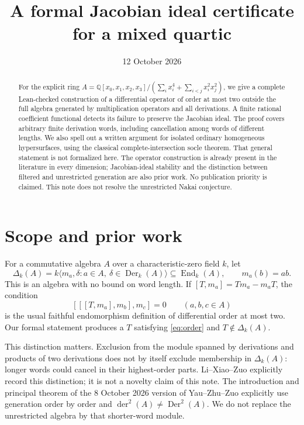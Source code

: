 \documentclass[11pt,letterpaper]{article}
\title{A formal Jacobian ideal certificate for a mixed quartic}
\author{}
\date{12 October 2026}
\theoremstyle{remark}\newtheorem{remark}[theorem]{Remark}
\DeclareMathOperator{\Der}{Der}
\DeclareMathOperator{\End}{End}
\newcommand{\QQ}{\mathbb Q}
\begin{document}
\maketitle
\begin{abstract}
For the explicit ring
\(A=\QQ[x_0,x_1,x_2,x_3]/(\sum_i x_i^4+\sum_{i<j}x_i^2x_j^2)\),
we give a complete Lean-checked construction of a differential operator of order
at most two outside the full algebra generated by multiplication operators and
all derivations. A finite rational coefficient functional detects its failure
to preserve the Jacobian ideal. The proof covers arbitrary finite derivation
words, including cancellation among words of different lengths. We also spell out
a written argument for isolated ordinary homogeneous hypersurfaces, using
the classical complete-intersection socle theorem. That general statement
is not formalized here. The operator construction is already present in the
literature in every dimension; Jacobian-ideal stability and the distinction
between filtered and unrestricted generation are also prior work. No
publication priority is claimed. This note does not
resolve the unrestricted Nakai conjecture.
\end{abstract}

\section{Scope and prior work}
For a commutative algebra \(A\) over a characteristic-zero field \(k\), let
\[
 \Delta_k(A)=k\langle m_a,\delta : a\in A,\ \delta\in\Der_k(A)\rangle
 \subseteq\End_k(A),\qquad m_a(b)=ab.
\]
This is an algebra with no bound on word length. If
\([T,m_a]=Tm_a-m_aT\), the condition
\begin{equation}\label{eq:order}
 [[[T,m_a],m_b],m_c]=0\qquad(a,b,c\in A)
\end{equation}
is the usual faithful endomorphism definition of differential order at most two.
Our formal statement produces a \(T\) satisfying \eqref{eq:order} and
\(T\notin\Delta_k(A)\).

This distinction matters. Exclusion from the module spanned by derivations and
products of two derivations does not by itself exclude membership in
\(\Delta_k(A)\): longer words could cancel in their highest-order parts.
Li--Xiao--Zuo \cite[Remark 1.1, pp.~1--2]{LXZ} explicitly record this
distinction; it is not a novelty claim of this note.
The introduction and principal theorem of the 8 October 2026 version of
Yau--Zhu--Zuo \cite{YZZ} explicitly use generation order by order and
\(\operatorname{der}^2(A)\ne\Der^2(A)\). We do not replace the unrestricted
algebra by that shorter-word module.
\end{document}
